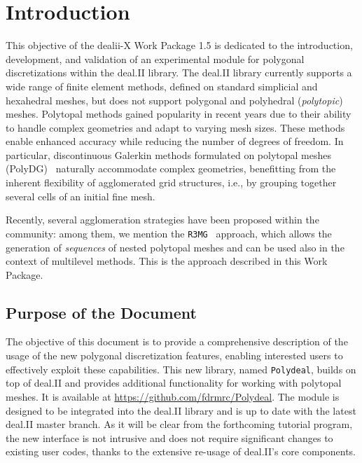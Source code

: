 \documentclass[a4paper,12pt]{article}
\begin{document}
\vspace*{2cm}

\disclaimer

\newpage

\tableofcontents %

\newpage

\section{{Introduction}}
This objective of the dealii-X Work Package 1.5 is dedicated to the introduction, development, and validation
of an experimental module for polygonal discretizations within the deal.II library. The deal.II library
currently supports a wide range of finite element methods, defined on standard simplicial
and hexahedral meshes, but does not support polygonal and polyhedral (\emph{polytopic}) meshes. Polytopal methods
gained popularity in recent years due to their ability to handle complex geometries and adapt to varying mesh
sizes. These methods enable enhanced accuracy while reducing the number of degrees
of freedom. In particular, discontinuous Galerkin methods formulated on polytopal meshes
(PolyDG)~\cite{polyDG,Antoniettihp} naturally accommodate complex geometries, benefitting from the inherent flexibility of
agglomerated grid structures, i.e., by grouping together several cells of an initial fine mesh.

Recently, several agglomeration strategies have been proposed within the community: among them, we mention
the \texttt{R3MG}~\cite{FEDER2025113773} approach, which
allows the generation of \emph{sequences} of nested polytopal meshes and can be used
also in the context of multilevel methods. This is the approach described in this Work Package.

\subsection{{Purpose of the Document}}
The objective of this document is to provide a comprehensive description of
the usage of the new polygonal discretization features, enabling interested users
to effectively exploit these capabilities.  This new library, named \texttt{Polydeal}, builds on top of
deal.II and provides additional functionality for working with polytopal meshes. It is
available at \url{https://github.com/fdrmrc/Polydeal}. The module is designed to be integrated
into the deal.II library and is up to date with the latest deal.II master branch. As it will be clear
from the forthcoming tutorial program, the new interface is not intrusive and does not require significant changes to existing user
codes, thanks to the extensive re-usage of deal.II's core components.
\end{document}
